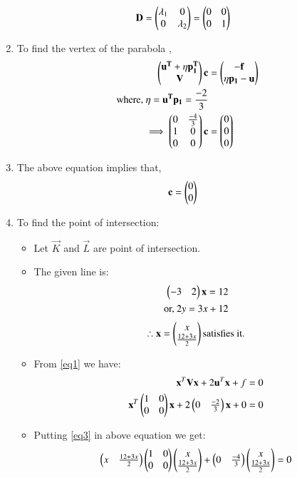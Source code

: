 \documentclass[journal,12pt,twocolumn]{IEEEtran}
\begin{document}
\begin{enumerate}
\begin{align}
\\
\mathbf{D} &= \begin{pmatrix}\lambda_1 & 0 \\ 0 & \lambda_2\end{pmatrix} =\begin{pmatrix}0 & 0 \\ 0 & 1\end{pmatrix} 
\end{align}
\item To find the vertex of the parabola ,
\begin{align} \begin{pmatrix}\mathbf{u^T}+\eta\mathbf{p_1^T}\\\mathbf{V} \end{pmatrix}\mathbf{c} &= \begin{pmatrix}\mathbf{-f}\\\eta \mathbf{p_1} -\mathbf{u}\end{pmatrix}
\\
\text{where, }  \eta = \mathbf{u^T}\mathbf{p_1} = \frac{-2}{3}
\\
\implies\begin{pmatrix}0 & \frac{-4}{3}\\1 & 0 \\0 & 0\end{pmatrix} \mathbf{c}&= \begin{pmatrix}0\\0\\0\end{pmatrix}
\end{align}
\item The above equation implies that,
\begin{align}    
   \mathbf{c} &= \begin{pmatrix}0 \\ 0\end{pmatrix}
\end{align}
\item To find the point of intersection:
\begin{itemize}
    \item Let $\vec{K}$ and $\vec{L}$ are point of intersection.
    \item The given line is:
\begin{align} 
\begin{pmatrix}-3&2\end{pmatrix}\mathbf{x}=12
\\
\text{or, }2y=3x+12 \label{eq2}
\end{align}
\begin{align}
\therefore \mathbf{x}=\begin{pmatrix}x\\\frac{12+3x}{2}\end{pmatrix} \text{satisfies it.}\label{eq3}   
\end{align}
\item From \eqref{eq1} we have:
\begin{align}
    \mathbf{x}^T\mathbf{V}\mathbf{x}+2\mathbf{u}^T\mathbf{x}+f=0
    \\
    \mathbf{x}^T\begin{pmatrix}1&0\\0&0\end{pmatrix}\mathbf{x}+2\begin{pmatrix}0&\frac{-2}{3}\end{pmatrix}\mathbf{x}+0=0
    \end{align}
\item Putting \eqref{eq3} in above equation we get:
\begin{align}
    \myvec{x&\frac{12+3x}{2}}\myvec{1&0\\0&0}\myvec{x\\\frac{12+3x}{2}}+\myvec{0&\frac{-4}{3}}\myvec{x\\\frac{12+3x}{2}}=0

\end{align}
\end{itemize}
\end{enumerate}
\end{document}
